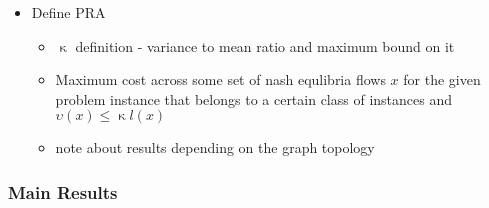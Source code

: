 \begin{itemize}
\item Define PRA 
    \begin{itemize} 
        \item $\upkappa$ definition -  variance to mean ratio and maximum bound on it
        \item Maximum cost across some set of nash equlibria flows $x$ for the given problem instance that belongs 
            to a certain class of instances and $\upsilon(x) \leq \upkappa l(x)$
        \item note about results depending on the graph topology
    \end{itemize}
\end{itemize}


\subsubsection{Main Results}
